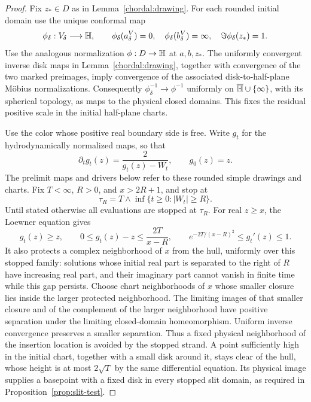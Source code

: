 \begin{proof}
Fix $z_*\in D$ as in Lemma~\ref{chordal:drawing}.  For each rounded
initial domain use the unique conformal map
\[
 \phi_\delta:V_\delta\longrightarrow\mathbb H,\qquad
 \phi_\delta(a_\delta^V)=0,\quad
 \phi_\delta(b_\delta^V)=\infty,\quad
 \Im\phi_\delta(z_*)=1.
\]
Use the analogous normalization $\phi:D\to\mathbb H$ at $a,b,z_*$.
The uniformly convergent inverse disk maps in
Lemma~\ref{chordal:drawing}, together with convergence of the two
marked preimages, imply convergence of the associated
disk-to-half-plane M\"obius normalizations.  Consequently
$\phi_\delta^{-1}\to\phi^{-1}$ uniformly on
$\overline{\mathbb H}\cup\{\infty\}$, with its spherical topology, as maps
to the physical closed domains.  This fixes the residual positive
scale in the initial half-plane charts.

Use the color whose positive real boundary side is free.
Write $g_t$ for the hydrodynamically
normalized maps, so that
\[
 \partial_tg_t(z)=\frac2{g_t(z)-W_t},\qquad g_0(z)=z.
\]
The prelimit maps and drivers below refer to these rounded simple
drawings and charts.  Fix $T<\infty$, $R>0$, and $x>2R+1$, and stop at
\[
 \tau_R=T\wedge\inf\{t\ge0:|W_t|\ge R\}.
\]
Until stated otherwise all evaluations are stopped at $\tau_R$.
For real $z\ge x$, the Loewner equation gives
\begin{equation}\label{chordal:ode-bounds}
 g_t(z)\ge z,\qquad
 0\le g_t(z)-z\le\frac{2T}{x-R},\qquad
 e^{-2T/(x-R)^2}\le g_t'(z)\le1.
\end{equation}
It also protects a complex neighborhood of $x$ from the hull,
uniformly over this stopped family: solutions whose initial real
part is separated to the right of $R$ have increasing real part,
and their imaginary part cannot vanish in finite time while this
gap persists.  Choose chart neighborhoods of $x$ whose smaller
closure lies inside the larger protected neighborhood.  The
limiting images of that smaller closure and of the complement of
the larger neighborhood have positive separation under the
limiting closed-domain homeomorphism.  Uniform inverse convergence
preserves a smaller separation.
Thus a fixed physical neighborhood of the insertion location is
avoided by the stopped strand.  A point sufficiently high in the
initial chart, together with a small disk around it, stays clear
of the hull, whose height is at most $2\sqrt T$ by the same
differential equation.  Its physical image supplies a basepoint
with a fixed disk in every stopped slit domain, as required in
Proposition~\ref{prop:slit-test}.


\end{proof}
